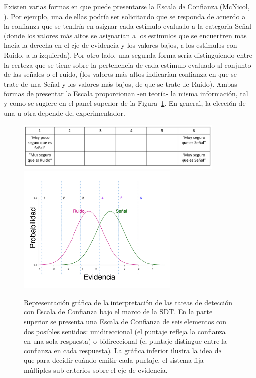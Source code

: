 \begin{itemize}
Existen varias formas en que puede presentarse la Escala de Confianza (McNicol, \citeyear{McNicol2}). Por ejemplo, una de ellas podría ser solicitando que se responda de acuerdo a la confianza que se tendría en asignar cada estímulo evaluado a la categoria Señal (donde los valores más altos se asignarían a los estímulos que se encuentren más hacia la derecha en el eje de evidencia y los valores bajos, a los estímulos con Ruido, a la izquierda). Por otro lado, una segunda forma sería distinguiendo entre la certeza que se tiene sobre la pertenencia de cada estímulo evaluado al conjunto de las señales o el ruido, (los valores más altos indicarían confianza en que se trate de una Señal y los valores más bajos, de que se trate de Ruido). Ambas formas de presentar la Escala proporcionan -en teoría- la misma información, tal y como se sugiere en el panel superior de la Figura~\ref{fig:Conf_Rat}. En general, la elección de una u otra depende del experimentador.\\

\begin{figure}[h]
\centering
\includegraphics[width=0.9\textwidth]{Figures/Puntajes_Criterios}\\
\includegraphics[width=0.70\textwidth]{Figures/ConfidenceRating}\\
\decoRule
\caption[Tareas de detección con Escala de Confianza y su interpretación]{Representación gráfica de la interpretación de las tareas de detección con Escala de Confianza bajo el marco de la SDT. En la parte superior se presenta una Escala de Confianza de seis elementos con dos posibles sentidos: unidireccional (el puntaje refleja la confianza en una sola respuesta) o bidireccional (el puntaje distingue entre la confianza en cada respuesta). La gráfica inferior ilustra la idea de que para decidir cuándo emitir cada puntaje, el sistema fija múltiples sub-criterios sobre el eje de evidencia.}
\label{fig:Conf_Rat}
\end{figure}


\end{itemize}
